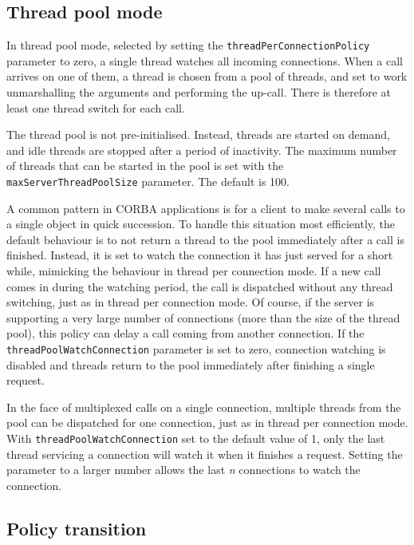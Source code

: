 \documentclass[11pt,twoside,a4paper]{book}
\newcommand{\code}[1]{\texttt{#1}}
\newcommand{\dsc}{\discretionary{}{}{}}
\begin{document}
\subsection{Thread pool mode}
\label{sec:watchConn}

In thread pool mode, selected by setting the
\code{threadPerConnectionPolicy} parameter to zero, a single thread
watches all incoming connections. When a call arrives on one of them,
a thread is chosen from a pool of threads, and set to work
unmarshalling the arguments and performing the up-call. There is
therefore at least one thread switch for each call.

The thread pool is not pre-initialised. Instead, threads are started
on demand, and idle threads are stopped after a period of inactivity.
The maximum number of threads that can be started in the pool is set
with the \code{maxServerThreadPool\dsc{}Size} parameter. The default
is 100.

A common pattern in CORBA applications is for a client to make several
calls to a single object in quick succession. To handle this situation
most efficiently, the default behaviour is to not return a thread to
the pool immediately after a call is finished. Instead, it is set to
watch the connection it has just served for a short while, mimicking
the behaviour in thread per connection mode. If a new call comes in
during the watching period, the call is dispatched without any thread
switching, just as in thread per connection mode. Of course, if the
server is supporting a very large number of connections (more than the
size of the thread pool), this policy can delay a call coming from
another connection. If the \code{threadPoolWatch\dsc{}Connection}
parameter is set to zero, connection watching is disabled and threads
return to the pool immediately after finishing a single request.

In the face of multiplexed calls on a single connection, multiple
threads from the pool can be dispatched for one connection, just as in
thread per connection mode. With \code{threadPoolWatchConnection} set
to the default value of 1, only the last thread servicing a connection
will watch it when it finishes a request. Setting the parameter to a
larger number allows the last \emph{n} connections to watch the
connection.


\subsection{Policy transition}
\end{document}
